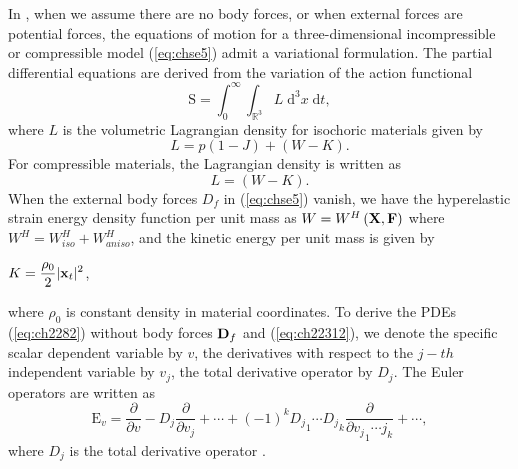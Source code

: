 \documentclass[11pt,letter,subeqn,fleqn]{article}
\DeclarePairedDelimiter{\abs}{\lvert}{\rvert}
\numberwithin{equation}{section}
\numberwithin{table}{section}
\numberwithin{figure}{section}
\def\vec#1{{\boldsymbol{\rm #1}}} %
\def\vec#1{{\boldsymbol{\rm #1}}} %
\begin{document}
In \cite{bluman2010applications,cheviakov2019radial}, when we assume there are no body forces, or when external forces are potential forces, the equations of motion for a three-dimensional incompressible or compressible model (\ref{eq:chse5}) admit a variational formulation. The partial differential equations are derived from the variation of the action functional
\begin{equation}\label{eq:actionf}
\mathrm{S}=\int_{0}^{\infty}\int_{\mathbb{R}^3}\textit{L}\; \mathrm{d}^{3}x\;\mathrm{d}t,
\end{equation}
\noindent where $L$ is the volumetric Lagrangian density for isochoric materials given by
\begin{equation}\label{eq:Lagr}
\textit{L}=p\left(1-J\right)+\left(W-K\right).
\end{equation}
For compressible materials, the Lagrangian density is written as
\begin{equation}\label{eq:Lagr1}
\textit{L}=\left(W-K\right).
\end{equation}
When the external body forces $D_{f}$ in (\ref{eq:chse5}) vanish, we have the hyperelastic strain energy density function per unit mass as $W=W^{H}\left(\vec{X},\vec{F}\right)$ where $W^{H}=W^{H}_{iso}+W^{H}_{aniso}$, and the kinetic energy per unit mass is given by
\begin{center}
	$\displaystyle K=\frac{\rho_{0}}{2}\abs{\vec{x}_{t}}^{2}$,
\end{center}
where $\rho_{0}$ is constant density in material coordinates.
To derive the PDEs (\ref{eq:ch2282}) without body forces $\vec{D}_{f}$ and (\ref{eq:ch22312}), we denote the specific scalar dependent variable by $v$, the derivatives with respect to the $j-th$ independent variable by $v_{j}$, the total derivative operator by $D_{j}$. The Euler operators are written as
\begin{equation}\label{eq:EulerO}
\mathrm{E}_{v}=\frac{\partial}{\partial v}-D_{j}\frac{\partial}{\partial v_{j}}+\cdots+\left(-1\right)^{k}{D_{j}}_{1}\cdots {D_{j}}_{k}\frac{\partial}{\partial {{v_{j}}_{1}\cdots {j}_{k}}}+\cdots,
\end{equation}
\noindent where $D_{j}$ is the total derivative operator \cite{bluman2013symmetries}.
\end{document}
